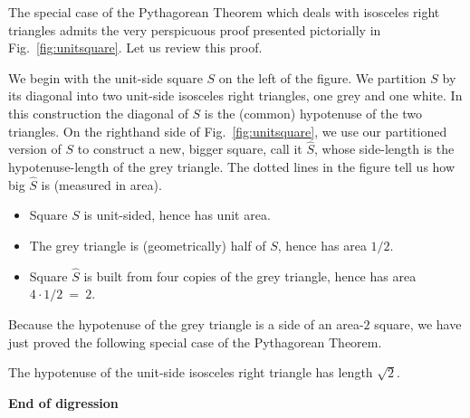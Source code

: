 
The special case of the Pythagorean Theorem which deals with
isosceles right triangles admits the very perspicuous proof presented
pictorially in Fig.~\ref{fig:unitsquare}.  Let us review this proof.

We begin with the unit-side square $S$ on the left of the figure.  We
partition $S$ by its diagonal into two unit-side isosceles right
triangles, one grey and one white.  In this construction the diagonal
of $S$ is the (common) hypotenuse of the two triangles.  On the
righthand side of Fig.~\ref{fig:unitsquare}, we use our partitioned
version of $S$ to construct a new, bigger square, call it
$\widehat{S}$, whose side-length is the hypotenuse-length of the grey
triangle.  The dotted lines in the figure tell us how big
$\widehat{S}$ is (measured in area).
\begin{itemize}
\item
Square $S$ is unit-sided, hence has unit area.
\item
The grey triangle is (geometrically) half of $S$, hence has area
$1/2$.
\item
Square $\widehat{S}$ is built from four copies of the grey
triangle, hence has area $4 \cdot 1/2 \ = \ 2$.
\end{itemize}
Because the hypotenuse of the grey triangle is a side of an area-$2$
square, we have just proved the following special case of the
Pythagorean Theorem.

\begin{prop}
\label{thm:unit-isosceles-PythThm}
The hypotenuse of the unit-side isosceles right triangle has length
$\sqrt{2}$.
\end{prop}
  
\noindent \textbf{End of digression}

\bigskip
  
